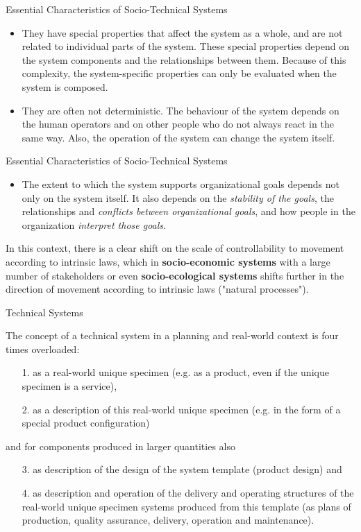 \documentclass{beamer}
\begin{document}
\begin{frame}{Essential Characteristics of Socio-Technical Systems}
\begin{itemize}
\item They have special properties that affect the system as a whole, and are
  not related to individual parts of the system. These special properties
  depend on the system components and the relationships between them. Because
  of this complexity, the system-specific properties can only be evaluated
  when the system is composed.\medskip
\item They are often not deterministic. The behaviour of the system depends on
  the human operators and on other people who do not always react in the same
  way. Also, the operation of the system can change the system itself.
\end{itemize}
\end{frame}

\begin{frame}{Essential Characteristics of Socio-Technical Systems}
\begin{itemize}
\item The extent to which the system supports organizational goals depends not
  only on the system itself. It also depends on the \emph{stability of the
    goals}, the relationships and \emph{conflicts between organizational
    goals}, and how people in the organization \emph{interpret those goals}.
\end{itemize}

In this context, there is a clear shift on the scale of controllability to
movement according to intrinsic laws, which in \textbf{socio-economic systems}
with a large number of stakeholders or even \textbf{socio-ecological systems}
shifts further in the direction of movement according to intrinsic laws
("natural processes").
\end{frame}


\begin{frame}{Technical Systems}

The concept of a technical system in a planning and real-world context is four
times overloaded:\small
\begin{itemize}
\item[1.] as a real-world unique specimen (e.g. as a product, even if the
  unique specimen is a service),
\item[2.] as a description of this real-world unique specimen (e.g. in the
  form of a special product configuration)
\end{itemize}
and for components produced in larger quantities also
\begin{itemize}
\item[3.] as description of the design of the system template (product design)
  and
\item[4.] as description and operation of the delivery and operating
  structures of the real-world unique specimen systems produced from this
  template (as plans of production, quality assurance, delivery, operation and
  maintenance).
\end{itemize}

\end{frame}
  
\end{document}
